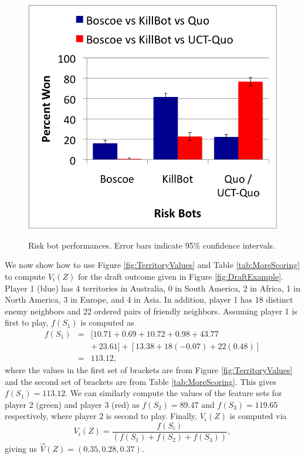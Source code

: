 \documentclass[letterpaper]{article}
\numberwithin{equation}{section}
\numberwithin{theorem}{section}
\numberwithin{lemma}{section}
\numberwithin{df}{section}
\begin{document}
\begin{figure}[t]
{		\includegraphics[scale=.45]{BoscoeKillQuo.png}
		\label{fig:BoscoeKillBotQuo}
	}
	\caption[]{Risk bot performances.  Error bars indicate 95\% confidence intervals.}
	\label{fig:RiskResults}
\end{figure}

We now show how to use Figure \ref{fig:TerritoryValues} and Table \ref{tab:MoreScoring} to compute $V_i(Z)$ for the draft outcome given in Figure \ref{fig:DraftExample}.  Player 1 (blue) has 4 territories in Australia, 0 in South America, 2 in Africa, 1 in North America, 3 in Europe, and 4 in Asia.  In addition, player 1 has 18 distinct enemy neighbors and 22 ordered pairs of friendly neighbors.  Assuming player 1 is first to play, $f(S_1)$ is computed as
\begin{eqnarray*}
 	f(S_1) &=& [10.71 + 0.69 + 10.72 + 0.98 + 43.77 \\ &&+\ 23.61] + [13.38 + 18(-0.07) + 22(0.48)] \\
 				 &=& 113.12,
\end{eqnarray*}
where the values in the first set of brackets are from Figure \ref{fig:TerritoryValues} and the second set of brackets are from Table \ref{tab:MoreScoring}.  This gives $f(S_1) = 113.12$.  We can similarly compute the values of the feature sets for player 2 (green) and player 3 (red) as %
$f(S_2) = 89.47$ and $f(S_3) = 119.65$ respectively, where player 2 is second to play.  Finally, $V_i(Z)$ is computed via %
\[ V_i(Z) = \frac{f(S_i)}{\left(f(S_1) + f(S_2) + f(S_3) \right)}, \]
giving us %
$\vec{V}(Z) = (0.35, 0.28, 0.37)$.
\end{document}
